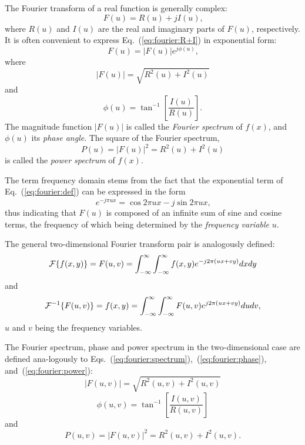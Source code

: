 The Fourier transform of a real function is generally complex:
\begin{equation}
\label{eq:fourier:R+I}
F(u)=R(u)+jI(u)\mbox{,}
\end{equation}
where $R(u)$ and $I(u)$ are the real and imaginary parts of $F(u)$,
respectively.  It is often convenient to express
Eq.~(\ref{eq:fourier:R+I}) in exponential form:
\begin{equation}
  F(u)=|F(u)|e^{j\phi(u)}\mbox{,}
\end{equation}
where
\begin{equation}
\label{eq:fourier:spectrum}
|F(u)|=\sqrt{R^{2}(u)+I^{2}(u)}
\end{equation}
and
\begin{equation}
\label{eq:fourier:phase}
\phi(u)=\tan^{-1}\left[\frac{I(u)}{R(u)}\right]\mbox{.}
\end{equation}
The magnitude function $|F(u)|$ is called the {\em Fourier spectrum\/}
of $f(x)$, and $\phi(u)$ its {\em phase angle\/}.  The square of the
Fourier spectrum,
\begin{equation}
\label{eq:fourier:power}
P(u)=|F(u)|^{2}=R^{2}(u)+I^{2}(u)
\end{equation}
is called the {\em power spectrum\/} of $f(x)$.

The term frequency domain stems from the fact that the exponential
term of Eq.~(\ref{eq:fourier:def}) can be expressed in the form
\begin{equation}
  e^{-j\pi ux}=\cos 2\pi ux-j\sin 2\pi ux\mbox{,}
\end{equation}
thus indicating that $F(u)$ is composed of an infinite sum of sine and
cosine terms, the frequency of which being determined by the {\em
frequency variable\/} $u$.

The general two-dimensional Fourier transform pair is analogously
defined:
\begin{equation}
  {\cal F}\{f(x,y)\}=F(u,v)=\int_{-\infty}^{\infty}
  \int_{-\infty}^{\infty}f(x,y)e^{-j2\pi(ux+vy)}dxdy
\end{equation}
and
\begin{equation}
  {\cal F}^{-1}\{F(u,v)\}=f(x,y)=\int_{-\infty}^{\infty}
  \int_{-\infty}^{\infty}F(u,v)e^{j2\pi(ux+vy)}dudv\mbox{,}
\end{equation}
$u$ and $v$ being the frequency variables.

The Fourier spectrum, phase and power spectrum in the two-dimensional
case are defined ana-logously to
Eqs.~(\ref{eq:fourier:spectrum}),~(\ref{eq:fourier:phase}),
and~(\ref{eq:fourier:power}):
\begin{equation}
\label{eq:fourier:spectrum2}
|F(u,v)|=\sqrt{R^{2}(u,v)+I^{2}(u,v)}
\end{equation}
\begin{equation}
\label{eq:fourier:phase2}
\phi(u,v)=\tan^{-1}\left[\frac{I(u,v)}{R(u,v)}\right]
\end{equation}
and
\begin{equation}
\label{eq:fourier:power2}
P(u,v)=|F(u,v)|^{2}=R^{2}(u,v)+I^{2}(u,v)\mbox{.} 
\end{equation}

